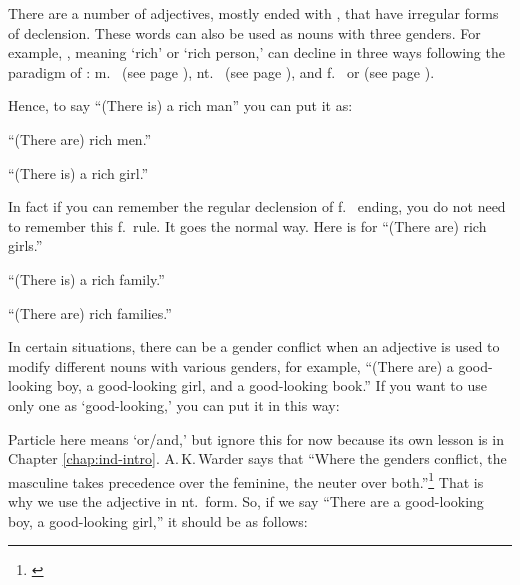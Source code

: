 There are a number of adjectives, mostly ended with , that have irregular forms of declension. These words can also be used as nouns with three genders. For example, , meaning `rich' or `rich person,' can decline in three ways following the paradigm of : m.\  (see page \pageref{decl:gunavm}), nt.\  (see page \pageref{decl:gunavnt}), and f.\  or  (see page \pageref{decl:gunavf}).

Hence, to say ``(There is) a rich man'' you can put it as:


``(There are) rich men.''


``(There is) a rich girl.''


In fact if you can remember the regular declension of f.\  ending, you do not need to remember this f.\ rule. It goes the normal way. Here is for ``(There are) rich girls.''


``(There is) a rich family.''


``(There are) rich families.''


In certain situations, there can be a gender conflict when an adjective is used to modify different nouns with various genders, for example, ``(There are) a good-looking boy, a good-looking girl, and a good-looking book.'' If you want to use only one  as `good-looking,' you can put it in this way:


Particle  here means `or/and,' but ignore this for now because its own lesson is in Chapter \ref{chap:ind-intro}. A.\,K.\,Warder says that ``Where the genders conflict, the masculine takes precedence over the feminine, the neuter over both.''\footnote{\citealp[p.~61]{warder:intro}} That is why we use the adjective in nt.\ form. So, if we say ``There are a good-looking boy, a good-looking girl,'' it should be as follows:


